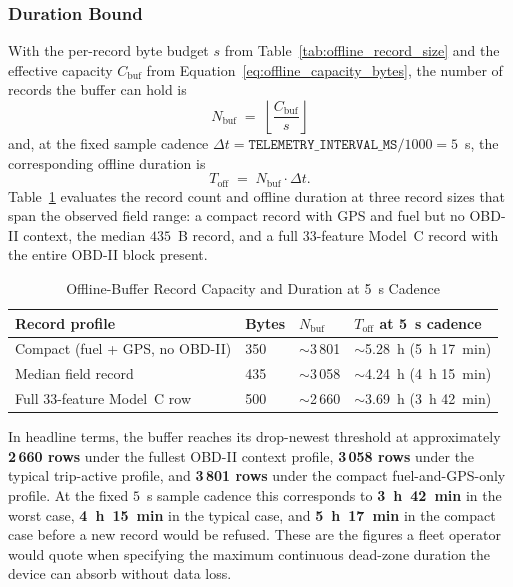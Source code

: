 \subsubsection{Duration Bound}
\label{sec:offline_duration_bound}

With the per-record byte budget $s$ from Table~\ref{tab:offline_record_size} and the effective capacity $C_{\mathrm{buf}}$ from Equation~\ref{eq:offline_capacity_bytes}, the number of records the buffer can hold is
\begin{equation}
\label{eq:offline_record_count}
N_{\mathrm{buf}} \;=\; \left\lfloor \frac{C_{\mathrm{buf}}}{s} \right\rfloor
\end{equation}
and, at the fixed sample cadence $\Delta t = \texttt{TELEMETRY\_INTERVAL\_MS}/1000 = 5$~s, the corresponding offline duration is
\begin{equation}
\label{eq:offline_duration}
T_{\mathrm{off}} \;=\; N_{\mathrm{buf}} \cdot \Delta t.
\end{equation}
Table~\ref{tab:offline_duration_bounds} evaluates the record count and offline duration at three record sizes that span the observed field range: a compact record with GPS and fuel but no OBD-II context, the median $435$~B record, and a full 33-feature Model~C record with the entire OBD-II block present.

\begin{table}[!htbp]
\centering
\caption{Offline-Buffer Record Capacity and Duration at 5~s Cadence}
\label{tab:offline_duration_bounds}
\small
\begin{tabular}{|p{}|p{}|p{}|p{}|}
\hline
\textbf{Record profile} & \textbf{Bytes} & \textbf{$N_{\mathrm{buf}}$} & \textbf{$T_{\mathrm{off}}$ at 5~s cadence} \\
\hline
Compact (fuel + GPS, no OBD-II) & 350 & $\sim$3\,801 & $\sim$5.28~h (5~h 17~min) \\
\hline
Median field record & 435 & $\sim$3\,058 & $\sim$4.24~h (4~h 15~min) \\
\hline
Full 33-feature Model~C row & 500 & $\sim$2\,660 & $\sim$3.69~h (3~h 42~min) \\
\hline
\end{tabular}
\end{table}

In headline terms, the buffer reaches its drop-newest threshold at approximately \textbf{2\,660 rows} under the fullest OBD-II context profile, \textbf{3\,058 rows} under the typical trip-active profile, and \textbf{3\,801 rows} under the compact fuel-and-GPS-only profile. At the fixed $5$~s sample cadence this corresponds to \textbf{3~h~42~min} in the worst case, \textbf{4~h~15~min} in the typical case, and \textbf{5~h~17~min} in the compact case before a new record would be refused. These are the figures a fleet operator would quote when specifying the maximum continuous dead-zone duration the device can absorb without data loss.

